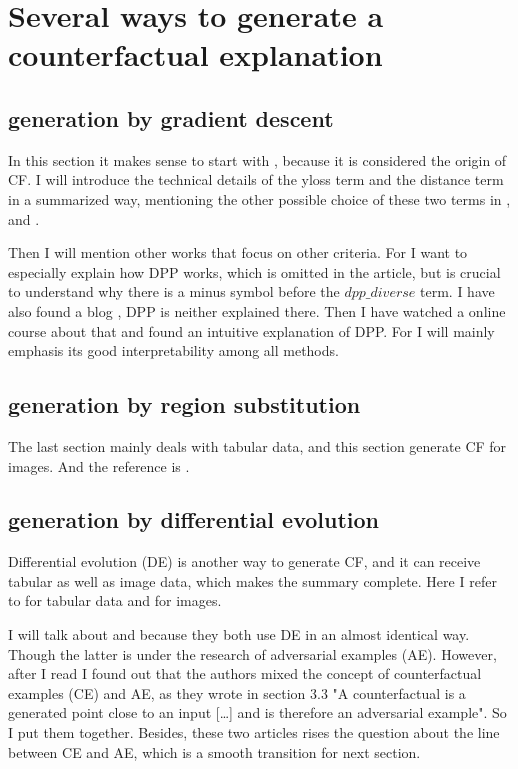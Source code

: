 \section{Several ways to generate a counterfactual explanation}\label{sec:generation}
\subsection{generation by gradient descent}
In this section it makes sense to start with \cite{watcher2017}, because it is considered the origin of CF. I will introduce the technical details of the yloss term and the distance term in a summarized way, mentioning the other possible choice of these two terms in \cite{DiCE},\cite{russellDiverse} and \cite{prototype}.

Then I will mention other works that focus on other criteria. For \cite{DiCE} I want to especially explain how DPP works, which is omitted in the article, but is crucial to understand why there is a minus symbol before the $dpp\_diverse$ term. I have also found a blog \cite{CFblog}, DPP is neither explained there. Then I have watched a online course about that and found an intuitive explanation of DPP. For \cite{prototype} I will mainly emphasis its good interpretability among all methods.
\subsection{generation by region substitution}
The last section mainly deals with tabular data, and this section generate CF for images. And the reference is \cite{visualCounterfactual}.
\subsection{generation by differential evolution}
Differential evolution (DE) is another way to generate CF, and it can receive tabular as well as image data, which makes the summary complete. Here I refer to \cite{certifai} for tabular data and \cite{onePixel} for images.

I will talk about \cite{certifai} and \cite{onePixel} because they both use DE in an almost identical way. Though the latter is under the research of adversarial examples (AE). However, after I read \cite{certifai} I found out that the authors mixed the concept of counterfactual examples (CE) and AE, as they wrote in section 3.3 "A counterfactual is a generated point close to an input [\dots] and is therefore an adversarial example". So I put them together. Besides, these two articles rises the question about the line between CE and AE, which is a smooth transition for next section.
